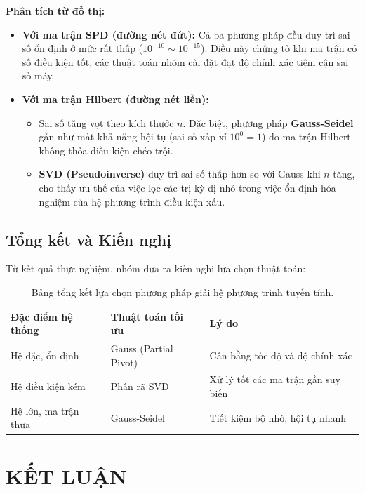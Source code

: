 \documentclass[a4paper,12pt]{article}
\begin{document}
\textbf{Phân tích từ đồ thị:}
\begin{itemize}
    \item \textbf{Với ma trận SPD (đường nét đứt):} Cả ba phương pháp đều duy trì sai số ổn định ở mức rất thấp ($10^{-10} \sim 10^{-15}$). Điều này chứng tỏ khi ma trận có số điều kiện tốt, các thuật toán nhóm cài đặt đạt độ chính xác tiệm cận sai số máy.
    \item \textbf{Với ma trận Hilbert (đường nét liền):} 
        \begin{itemize}
            \item Sai số tăng vọt theo kích thước $n$. Đặc biệt, phương pháp \textbf{Gauss-Seidel} gần như mất khả năng hội tụ (sai số xấp xỉ $10^0 = 1$) do ma trận Hilbert không thỏa điều kiện chéo trội.
            \item \textbf{SVD (Pseudoinverse)} duy trì sai số thấp hơn so với Gauss khi $n$ tăng, cho thấy ưu thế của việc lọc các trị kỳ dị nhỏ trong việc ổn định hóa nghiệm của hệ phương trình điều kiện xấu.
        \end{itemize}
\end{itemize}

\subsection{Tổng kết và Kiến nghị}
Từ kết quả thực nghiệm, nhóm đưa ra kiến nghị lựa chọn thuật toán:

\begin{table}[H]
    \centering
    \begin{tabular}{|l|l|l|}
    \hline
    \textbf{Đặc điểm hệ thống} & \textbf{Thuật toán tối ưu} & \textbf{Lý do} \\ \hline
    Hệ đặc, ổn định & Gauss (Partial Pivot) & Cân bằng tốc độ và độ chính xác \\ \hline
    Hệ điều kiện kém & Phân rã SVD & Xử lý tốt các ma trận gần suy biến \\ \hline
    Hệ lớn, ma trận thưa & Gauss-Seidel & Tiết kiệm bộ nhớ, hội tụ nhanh \\ \hline
    \end{tabular}
    \caption{Bảng tổng kết lựa chọn phương pháp giải hệ phương trình tuyến tính.}
\end{table}


\section{KẾT LUẬN}
\end{document}
